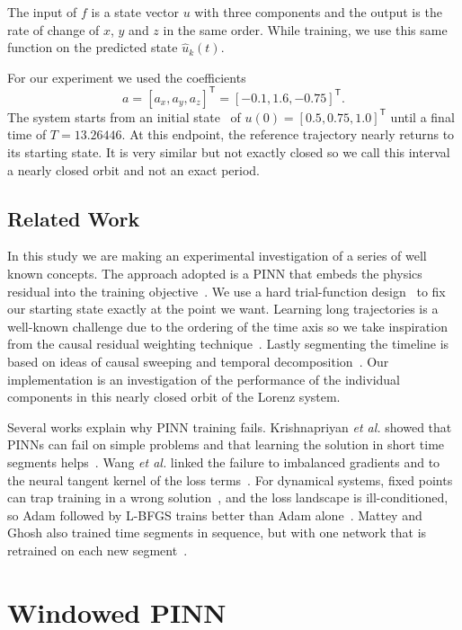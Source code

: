 \documentclass[conference,a4paper]{IEEEtran}
\begin{document}
The input of $f$ is a state vector $u$ with three components and the output is the rate of change of $x$, $y$ and $z$ in the same order. While training, we use this same function on the predicted state $\hat{u}_k(t)$.

For our experiment we used the coefficients
\[
a=[a_x,a_y,a_z]^\mathsf{T}=[-0.1,1.6,-0.75]^\mathsf{T}.
\]
 The system starts from an initial state~\cite{matthews2024pinnde} of $u(0)=[0.5,0.75,1.0]^\mathsf{T}$ until a final time of $T=13.26446$. At this endpoint, the reference trajectory nearly returns to its starting state. It is very similar but not exactly closed so we call this interval a nearly closed orbit and not an exact period.


\subsection{Related Work}
In this study we are making an experimental investigation of a series of well known concepts. The approach adopted is a PINN that embeds the physics residual into the training objective~\cite{raissi2019}. We use a hard trial-function design~\cite{lagaris1998} to fix our starting state exactly at the point we want. Learning long trajectories is a well-known challenge due to the ordering of the time axis so we take inspiration from the causal residual weighting technique~\cite{wang2024causal}. Lastly segmenting the timeline is based on ideas of causal sweeping and temporal decomposition~\cite{penwarden2023}. Our implementation is an investigation of the performance of the individual components in this nearly closed orbit of the Lorenz system.

Several works explain why PINN training fails. Krishnapriyan \emph{et al.} showed that PINNs can fail on simple problems and that learning the solution in short time segments helps~\cite{krishnapriyan2021}. Wang \emph{et al.} linked the failure to imbalanced gradients and to the neural tangent kernel of the loss terms~\cite{wang2021gradient,wang2022ntk}. For dynamical systems, fixed points can trap training in a wrong solution~\cite{rohrhofer2023}, and the loss landscape is ill-conditioned, so Adam followed by L-BFGS trains better than Adam alone~\cite{rathore2024}. Mattey and Ghosh also trained time segments in sequence, but with one network that is retrained on each new segment~\cite{mattey2022bcpinn}.

\section{Windowed PINN}
\label{sec:windowed-pinn}
\end{document}
